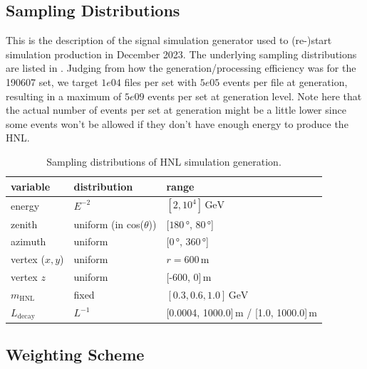 \subsection{Sampling Distributions}

This is the description of the signal simulation generator used to (re-)start simulation production in December 2023. The underlying sampling distributions are listed in . Judging from how the generation/processing efficiency was for the 190607 set, we target $1e04$ files per set with $5e05$ events per file at generation, resulting in a maximum of $5e09$ events per set at generation level. Note here that the actual number of events per set at generation might be a little lower since some events won't be allowed if they don't have enough energy to produce the HNL.

\begin{table}
    \centering
    \begin{tabular} { l || l | l}
        variable & distribution & range \\
        \hline \hline 
        energy & $E^{-2}$ & $[2, 10^4]\,\si{\GeV}$ \\
        zenith & uniform (in cos($\theta$)) & [$180\,\si{\degree}$, $80\,\si{\degree}$] \\
        azimuth & uniform & [$0\,\si{\degree}$, $360\,\si{\degree}$] \\
        vertex ($x,y$) & uniform & $r=600$\,\si{\m} \\
        vertex $z$ & uniform & [-600, 0]\,\si{\m} \\
        $m_\mathrm{HNL}$ & fixed & $[0.3, 0.6, 1.0]\,\si{\GeV}$ \\
        $L_\mathrm{decay}$ & $L^{-1}$ & [0.0004, 1000.0]\,\si{\m} / [1.0, 1000.0]\,\si{\m} \\
    \end{tabular}
    \caption{Sampling distributions of HNL simulation generation.}   
\end{table}


\subsection{Weighting Scheme}

